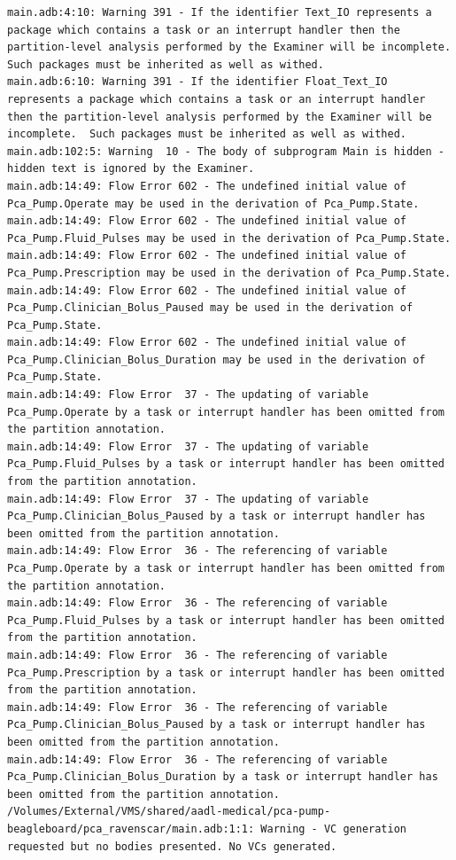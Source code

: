 \begin{lstlisting}
main.adb:4:10: Warning 391 - If the identifier Text_IO represents a package which contains a task or an interrupt handler then the partition-level analysis performed by the Examiner will be incomplete.  Such packages must be inherited as well as withed.
main.adb:6:10: Warning 391 - If the identifier Float_Text_IO represents a package which contains a task or an interrupt handler then the partition-level analysis performed by the Examiner will be incomplete.  Such packages must be inherited as well as withed.
main.adb:102:5: Warning  10 - The body of subprogram Main is hidden - hidden text is ignored by the Examiner.
main.adb:14:49: Flow Error 602 - The undefined initial value of Pca_Pump.Operate may be used in the derivation of Pca_Pump.State.
main.adb:14:49: Flow Error 602 - The undefined initial value of Pca_Pump.Fluid_Pulses may be used in the derivation of Pca_Pump.State.
main.adb:14:49: Flow Error 602 - The undefined initial value of Pca_Pump.Prescription may be used in the derivation of Pca_Pump.State.
main.adb:14:49: Flow Error 602 - The undefined initial value of Pca_Pump.Clinician_Bolus_Paused may be used in the derivation of Pca_Pump.State.
main.adb:14:49: Flow Error 602 - The undefined initial value of Pca_Pump.Clinician_Bolus_Duration may be used in the derivation of Pca_Pump.State.
main.adb:14:49: Flow Error  37 - The updating of variable Pca_Pump.Operate by a task or interrupt handler has been omitted from the partition annotation.
main.adb:14:49: Flow Error  37 - The updating of variable Pca_Pump.Fluid_Pulses by a task or interrupt handler has been omitted from the partition annotation.
main.adb:14:49: Flow Error  37 - The updating of variable Pca_Pump.Clinician_Bolus_Paused by a task or interrupt handler has been omitted from the partition annotation.
main.adb:14:49: Flow Error  36 - The referencing of variable Pca_Pump.Operate by a task or interrupt handler has been omitted from the partition annotation.
main.adb:14:49: Flow Error  36 - The referencing of variable Pca_Pump.Fluid_Pulses by a task or interrupt handler has been omitted from the partition annotation.
main.adb:14:49: Flow Error  36 - The referencing of variable Pca_Pump.Prescription by a task or interrupt handler has been omitted from the partition annotation.
main.adb:14:49: Flow Error  36 - The referencing of variable Pca_Pump.Clinician_Bolus_Paused by a task or interrupt handler has been omitted from the partition annotation.
main.adb:14:49: Flow Error  36 - The referencing of variable Pca_Pump.Clinician_Bolus_Duration by a task or interrupt handler has been omitted from the partition annotation.
/Volumes/External/VMS/shared/aadl-medical/pca-pump-beagleboard/pca_ravenscar/main.adb:1:1: Warning - VC generation requested but no bodies presented. No VCs generated.
\end{lstlisting}





